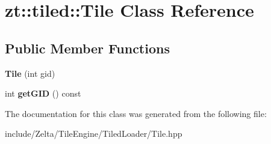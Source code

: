 \hypertarget{classzt_1_1tiled_1_1_tile}{}\section{zt\+:\+:tiled\+:\+:Tile Class Reference}
\label{classzt_1_1tiled_1_1_tile}
\subsection*{Public Member Functions}
\begin{DoxyCompactItemize}
\item 
\mbox{\label{classzt_1_1tiled_1_1_tile_aa178268dae96e986737e3f1753da0aaa}} 
{\bfseries Tile} (int gid)
\item 
\mbox{\label{classzt_1_1tiled_1_1_tile_a2b9b5baee7c8816366bc553a84b24c77}} 
int {\bfseries get\+G\+ID} () const
\end{DoxyCompactItemize}


The documentation for this class was generated from the following file\+:\begin{DoxyCompactItemize}
\item 
include/\+Zelta/\+Tile\+Engine/\+Tiled\+Loader/Tile.\+hpp\end{DoxyCompactItemize}
